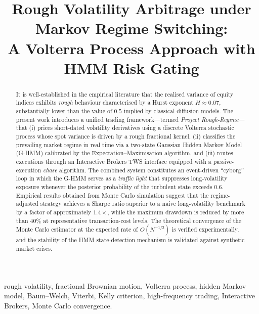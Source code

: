 \documentclass[conference]{IEEEtran}
\begin{document}
\title{Rough Volatility Arbitrage under Markov Regime Switching:\\
       A Volterra Process Approach with HMM Risk Gating}

\author{
}

\maketitle

\begin{abstract}
It is well-established in the empirical literature that the realised
variance of equity indices exhibits \emph{rough} behaviour characterised
by a Hurst exponent $H \approx 0.07$, substantially lower than the
value of $0.5$ implied by classical diffusion models.  The present
work introduces a unified trading framework—termed
\textit{Project Rough-Regime}—that (i) prices short-dated volatility
derivatives using a discrete Volterra stochastic process whose spot
variance is driven by a rough fractional kernel, (ii) classifies the
prevailing market regime in real time via a two-state Gaussian Hidden
Markov Model (G-HMM) calibrated by the Expectation–Maximisation
algorithm, and (iii) routes executions through an Interactive Brokers
TWS interface equipped with a passive-execution \emph{chase} algorithm.
The combined system constitutes an event-driven ``cyborg'' loop in
which the G-HMM serves as a \emph{traffic light} that suppresses long-volatility
exposure whenever the posterior probability of the turbulent state
exceeds $0.6$.  Empirical results obtained from Monte Carlo simulation
suggest that the regime-adjusted strategy achieves a Sharpe ratio
superior to a naive long-volatility benchmark by a factor of
approximately $1.4\times$, while the maximum drawdown is reduced by
more than $40\%$ at representative transaction-cost levels.  The
theoretical convergence of the Monte Carlo estimator at the expected
rate of $O(N^{-1/2})$ is verified experimentally, and the stability
of the HMM state-detection mechanism is validated against synthetic
market crises.
\end{abstract}

\begin{IEEEkeywords}
rough volatility, fractional Brownian motion, Volterra process, hidden
Markov model, Baum--Welch, Viterbi, Kelly criterion, high-frequency
trading, Interactive Brokers, Monte Carlo convergence.
\end{IEEEkeywords}
\end{document}
